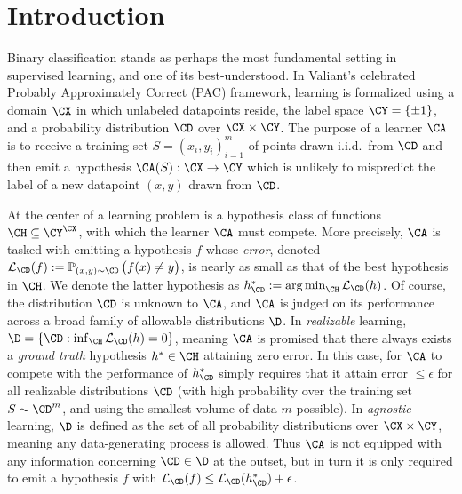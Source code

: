 \section{Introduction}\label{Section:Introduction}
Binary classification stands as perhaps the most fundamental setting in supervised learning, and one of its best-understood. In Valiant's celebrated Probably Approximately Correct (PAC) framework, learning is formalized using a domain $\CX$ in which unlabeled datapoints reside, the label space $\CY = \{\pm 1\}$, and a probability distribution $\CD$ over $\CX \times \CY$. The purpose of a learner $\CA$ is to receive a training set $S = (x_i, y_i)_{i=1}^m$ of points drawn i.i.d.\ from $\CD$ and then emit a hypothesis $\CA(S) : \CX \to \CY$ which is unlikely to mispredict the label of a new datapoint $(x, y)$ drawn from $\CD$.  

At the center of a learning problem is a hypothesis class of functions $\CH \subseteq \CY^\CX$, with which the learner $\CA$ must compete. More precisely, $\CA$ is tasked with emitting a hypothesis $f$ whose \emph{error}, denoted $\ls_\CD(f) := \P_{(x, y) \sim \CD} \big( f(x) \neq y \big)$, is nearly as small as that of the best hypothesis in $\CH$. We denote the latter hypothesis as $h^*_\CD := \argmin_{\CH} \ls_\CD(h)$. Of course, the distribution $\CD$ is unknown to $\CA$, and $\CA$ is judged on its performance across a broad family of allowable distributions $\D$. In \emph{realizable} learning, $\D = \{\CD : \inf_\CH \ls_\CD(h) = 0\}$,
meaning $\CA$ is promised that there always exists a \emph{ground truth} hypothesis $h^* \in \CH$ attaining zero error. 
In this case, for $\CA$ to compete with the performance of $h^*_\CD$ simply requires that it attain error $\leq \epsilon$ for all realizable distributions $\CD$ (with high probability over the training set $S \sim \CD^m$, and using the smallest volume of data $m$ possible). In \emph{agnostic} learning, $\D$ is defined as the set of all probability distributions over $\CX \times \CY$, meaning any data-generating process is allowed. Thus $\CA$ is not equipped with any information concerning $\CD \in \D$ at the outset, but in turn it is only required to emit a hypothesis $f$ with $\ls_\CD (f) \leq \ls_\CD(h^*_\CD) + \epsilon$. 

